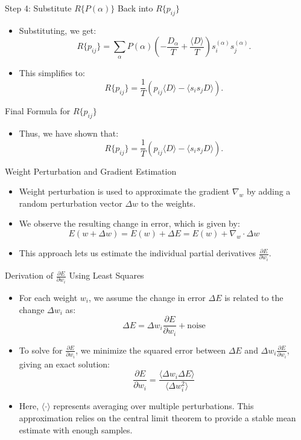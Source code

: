 \documentclass{beamer}
\begin{document}
\begin{frame}{Step 4: Substitute \( R\{P(\alpha)\} \) Back into \( R\{p_{ij}\} \)}
    \begin{itemize}
        \item Substituting, we get:
        \[
        R\{p_{ij}\} = \sum_\alpha P(\alpha) \left(-\frac{D_\alpha}{T} + \frac{\langle D \rangle}{T}\right) s_i^{(\alpha)} s_j^{(\alpha)}.
        \]
        \item This simplifies to:
        \[
        R\{p_{ij}\} = \frac{1}{T} \left( p_{ij} \langle D \rangle - \langle s_i s_j D \rangle \right).
        \]
    \end{itemize}
\end{frame}

\begin{frame}{Final Formula for \( R\{p_{ij}\} \)}
    \begin{itemize}
        \item Thus, we have shown that:
        \[
        R\{p_{ij}\} = \frac{1}{T} \left( p_{ij} \langle D \rangle - \langle s_i s_j D \rangle \right).
        \]
    \end{itemize}
\end{frame}


\begin{frame}{Weight Perturbation and Gradient Estimation}
    \begin{itemize}
        \item Weight perturbation is used to approximate the gradient \(\nabla_w\) by adding a random perturbation vector \(\Delta w\) to the weights.
        \item We observe the resulting change in error, which is given by:
        \[
        E(w + \Delta w) = E(w) + \Delta E = E(w) + \nabla_w \cdot \Delta w
        \]
        \item This approach lets us estimate the individual partial derivatives \(\frac{\partial E}{\partial w_i}\).
    \end{itemize}
\end{frame}

\begin{frame}{Derivation of \(\frac{\partial E}{\partial w_i}\) Using Least Squares}
    \begin{itemize}
        \item For each weight \(w_i\), we assume the change in error \(\Delta E\) is related to the change \(\Delta w_i\) as:
        \[
        \Delta E = \Delta w_i \frac{\partial E}{\partial w_i} + \text{noise}
        \]
        \item To solve for \(\frac{\partial E}{\partial w_i}\), we minimize the squared error between \(\Delta E\) and \(\Delta w_i \frac{\partial E}{\partial w_i}\), giving an exact solution:
        \[
        \frac{\partial E}{\partial w_i} = \frac{\langle \Delta w_i \Delta E \rangle}{\langle \Delta w_i^2 \rangle}
        \]
        \item Here, \(\langle \cdot \rangle\) represents averaging over multiple perturbations. This approximation relies on the central limit theorem to provide a stable mean estimate with enough samples.
    \end{itemize}
\end{frame}
\end{document}
